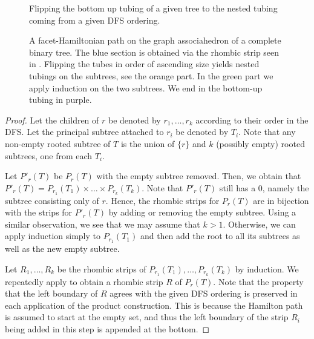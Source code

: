 \documentclass[fontsize=11pt,a4paper,DIV=12]{scrartcl}
\begin{document}
 \begin{figure}[!ht]
     \centering
     
     \caption{Flipping the bottom up tubing of a given tree to the nested tubing coming from a given DFS ordering.}
     \label{fig:tree flipping up}
 \end{figure}

 \begin{figure}[!ht]
    \centering
    
    \caption{A facet-Hamiltonian path on the graph associahedron of a complete binary tree. The blue section is obtained via the rhombic strip seen in . Flipping the tubes in order of ascending size yields nested tubings on the subtrees, see the orange part. In the green part we apply induction on the two subtrees. We end in the bottom-up tubing in purple.}
    \label{fig:fh for complete binary}
\end{figure}

\treeassociahedrars*
\begin{proof}
    Let the children of $r$ be denoted by $r_1,\ldots,r_k$ according to their order in the DFS. Let the principal subtree attached to $r_i$ be denoted by $T_i$. Note that any non-empty rooted subtree of $T$ is the union of $\{r\}$ and $k$ (possibly empty) rooted subtrees, one from each $T_i$. 

    Let $P'_r(T)$ be $P_r(T)$ with the empty subtree removed. Then, we obtain that $P'_r(T) = P_{r_1}(T_1)\times\ldots\times P_{r_k}(T_k)$. Note that $P'_r(T)$ still has a 0, namely the subtree consisting only of $r$. Hence, the rhombic strips for $P_r(T)$ are in bijection with the strips for $P'_r(T)$ by adding or removing the empty subtree. Using a similar observation, we see that we may assume that $k>1$. Otherwise, we can apply induction simply to $P_{r_1}(T_1)$ and then add the root to all its subtrees as well as the new empty subtree.
    
    Let $R_1,\ldots,R_k$ be the rhombic strips of $P_{r_1}(T_1),\ldots,P_{r_k}(T_k)$ by induction. We repeatedly apply  to obtain a rhombic strip $R$ of $P_{r}(T)$. Note that the property that the left boundary of $R$ agrees with the given DFS ordering is preserved in each application of the product construction. This is because the Hamilton path is assumed to start at the empty set, and thus the left boundary of the strip $R_i$ being added in this step is appended at the bottom.
\end{proof}
\end{document}
